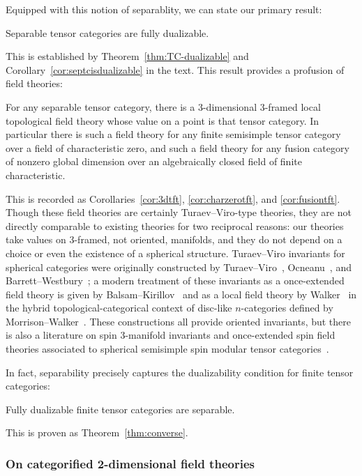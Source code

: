 \documentclass{amsart}
\begin{document}
Equipped with this notion of separablity, we can state our primary result:
\begin{maintheorem} \label{thm1}
Separable tensor categories are fully dualizable.
\end{maintheorem}
\nid This is established by Theorem~\ref{thm:TC-dualizable} and Corollary~\ref{cor:septcisdualizable} in the text.  This result provides a profusion of field theories:
\begin{maincor} \label{cor2}
For any separable tensor category, there is a 3-dimensional 3-framed local topological field theory whose value on a point is that tensor category.  In particular there is such a field theory for any finite semisimple tensor category over a field of characteristic zero, and such a field theory for any fusion category of nonzero global dimension over an algebraically closed field of finite characteristic.
\end{maincor}
\nid This is recorded as Corollaries~\ref{cor:3dtft}, \ref{cor:charzerotft}, and \ref{cor:fusiontft}.  Though these field theories are certainly Turaev--Viro-type theories, they are not directly comparable to existing theories for two reciprocal reasons: our theories take values on 3-framed, not oriented, manifolds, and they do not depend on a choice or even the existence of a spherical structure.  Turaev--Viro invariants for spherical categories were originally constructed by Turaev--Viro~\cite{MR1191386, MR1292673}, Ocneanu~\cite{MR1317353}, and Barrett--Westbury~\cite{MR1686423}; a modern treatment of these invariants as a once-extended field theory is given by Balsam--Kirillov~\cite{1004.1533} and as a local field theory by Walker~\cite{kw:tqft} in the hybrid topological-categorical context of disc-like $n$-categories defined by Morrison--Walker~\cite{1009.5025}.  These constructions all provide oriented invariants, but there is also a literature on spin 3-manifold invariants and once-extended spin field theories associated to spherical semisimple spin modular tensor categories~\cite{MR1117149, MR1171303, MR1387228, MR1880321}.

In fact, separability precisely captures the dualizability condition for finite tensor categories:
\begin{maintheorem} \label{thm3}
Fully dualizable finite tensor categories are separable.
\end{maintheorem}
\nid This is proven as Theorem~\ref{thm:converse}.

\subsubsection{On categorified 2-dimensional field theories}
\end{document}
